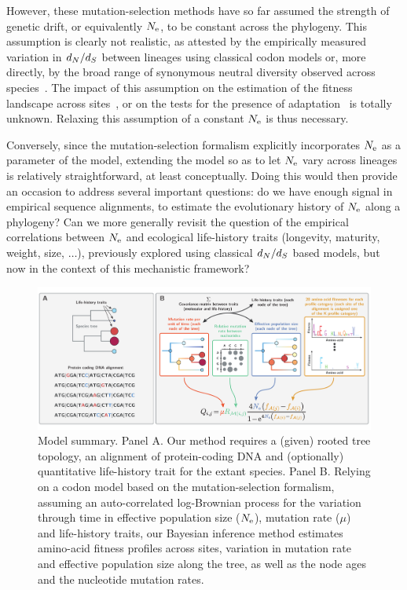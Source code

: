 \documentclass{MBE}
\begin{document}
	However, these mutation-selection methods have so far assumed the strength of {genetic drift}, or equivalently $N_{\text{e}}$, to be constant across the phylogeny.
	This assumption is clearly not realistic, as attested by the empirically measured variation in $d_N / d_S$ between lineages using classical {codon} models or, more directly, by the broad range of {synonymous} {neutral} diversity observed across species~\citep{Galtier2016}.
	The impact of this assumption on the estimation of the fitness landscape across sites~\citep{Tamuri2014, Rodrigue2014}, or on the tests for the presence of adaptation~\citep{Rodrigue2016, Bloom2017} is totally unknown.
	Relaxing this assumption of a constant $N_{\text{e}}$ is thus necessary.

	Conversely, since the mutation-selection formalism explicitly incorporates $N_{\text{e}}$ as a parameter of the model, extending the model so as to let $N_{\text{e}}$ vary across lineages is relatively straightforward, at least conceptually.
	Doing this would then provide an occasion to address several important questions: do we have enough signal in empirical sequence alignments, to estimate the evolutionary history of $N_{\text{e}}$ along a phylogeny?
	Can we more generally revisit the question of the empirical correlations between $N_{\text{e}}$ and ecological life-history traits (longevity, maturity, weight, size, $\hdots$), previously explored using classical $d_N / d_S$ based models, but now in the context of this mechanistic framework?

	\begin{figure}[t]
		\begin{center}
		\includegraphics[width=\textwidth] {model_summary.pdf}
		\end{center}
		\caption[Model summary]{
		Model summary.
		Panel A.
		Our method requires a (given) rooted tree topology, an alignment of protein-coding DNA and (optionally) quantitative life-history trait for the extant species.
		Panel B.
		Relying on a codon model based on the mutation-selection formalism, assuming an auto-correlated log-Brownian process for the variation through time in effective population size ($N_{\text{e}}$), mutation rate ($\mu$) and life-history traits, our Bayesian inference method estimates amino-acid fitness profiles across sites, variation in mutation rate and effective population size along the tree, as well as the node ages and the nucleotide mutation rates.}
		\label{fig:modelSummary}
	\end{figure}
\end{document}
